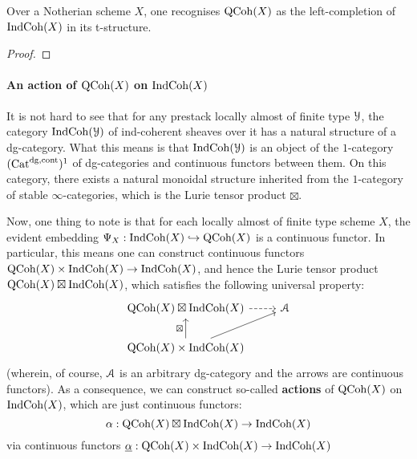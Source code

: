                     \begin{proposition} \label{prop: qcoh_is_the_left_completion_of_indcoh}
                        Over a Notherian scheme $X$, one recognises $\mathrm{QCoh}(X)$ as the left-completion of $\mathrm{Ind}\mathrm{Coh}(X)$ in its t-structure.
                    \end{proposition}
                        \begin{proof}
                            
                        \end{proof}
                    
                \paragraph{An action of \texorpdfstring{$\mathrm{QCoh}(X)$}{} on \texorpdfstring{$\mathrm{Ind}\mathrm{Coh}(X)$}{}}
                    It is not hard to see that for any prestack locally almost of finite type $\mathcal{Y}$, the category $\mathrm{Ind}\mathrm{Coh}(\mathcal{Y})$ of ind-coherent sheaves over it has a natural structure of a dg-category. What this means is that $\mathrm{Ind}\mathrm{Coh}(\mathcal{Y})$ is an object of the $1$-category $(\mathrm{Cat}^{\mathrm{dg}, \mathrm{cont}})^1$ of dg-categories and continuous functors between them. On this category, there exists a natural monoidal structure inherited from the $1$-category of stable $\infty$-categories, which is the Lurie tensor product $\boxtimes$. 
                
                    Now, one thing to note is that for each locally almost of finite type scheme $X$, the evident embedding $\Psi_X: \mathrm{Ind}\mathrm{Coh}(X) \hookrightarrow \mathrm{QCoh}(X)$ is a continuous functor. In particular, this means one can construct continuous functors $\QCoh(X) \x \Ind\Coh(X) \to \Ind\Coh(X)$, and hence the Lurie tensor product $\mathrm{QCoh}(X) \boxtimes \mathrm{Ind}\mathrm{Coh}(X)$, which satisfies the following universal property:
                        $$
                            \begin{tikzcd}
                            	{\QCoh(X) \boxtimes \Ind\Coh(X)} & \calA \\
                            	{\QCoh(X) \x \Ind\Coh(X)}
                            	\arrow[from=2-1, to=1-2]
                            	\arrow[dashed, from=1-1, to=1-2]
                            	\arrow["\boxtimes", from=2-1, to=1-1]
                            \end{tikzcd}
                        $$
                    (wherein, of course, $\mathcal{A}$ is an arbitrary dg-category and the arrows are continuous functors). As a consequence, we can construct so-called \textbf{actions} of $\mathrm{QCoh}(X)$ on $\mathrm{Ind}\mathrm{Coh}(X)$, which are just continuous functors:
                        $$\alpha: \mathrm{QCoh}(X) \boxtimes \mathrm{Ind}\mathrm{Coh}(X) \to \mathrm{Ind}\mathrm{Coh}(X)$$
                    via continuous functors $\underline{\alpha}: \QCoh(X) \x \Ind\Coh(X) \to \Ind\Coh(X)$
                        
